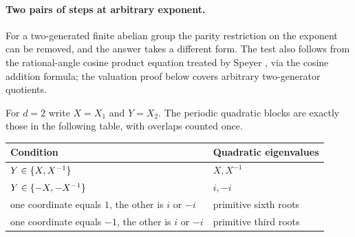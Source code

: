 
\paragraph{Two pairs of steps at arbitrary exponent.}
For a two-generated finite abelian group the parity restriction on the exponent can be
removed, and the answer takes a different form. The test also follows from the
rational-angle cosine product equation treated by Speyer \cite{Speyer2023Answer}, via the
cosine addition formula; the valuation proof below covers arbitrary two-generator
quotients.

\begin{theorem}\label{gra:thm:grovertwo}
For $d=2$ write $X=X_1$ and $Y=X_2$. The periodic quadratic blocks are exactly those in the
following table, with overlaps counted once.
\begin{center}\small
\begin{tabular}{ll}\toprule
Condition & Quadratic eigenvalues\\\midrule
$Y\in\{X,X^{-1}\}$ & $X,X^{-1}$\\
$Y\in\{-X,-X^{-1}\}$ & $i,-i$\\
one coordinate equals $1$, the other is $i$ or $-i$ & primitive sixth roots\\
one coordinate equals $-1$, the other is $i$ or $-i$ & primitive third roots\\
\bottomrule\end{tabular}
\end{center}
\end{theorem}

